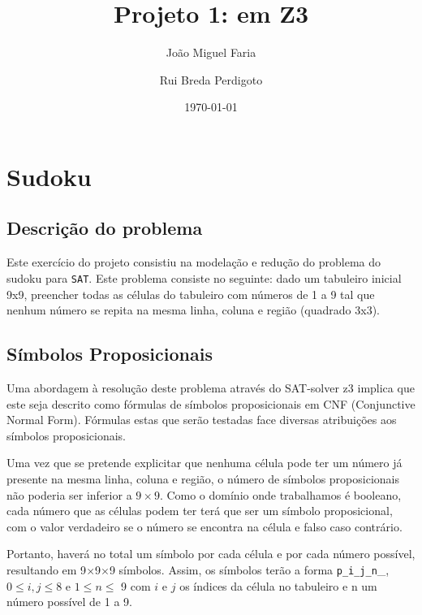 \documentclass[a4paper,12pt]{article}
\title{Projeto 1: \sat em {Z3}}
\author{João Miguel Faria \and Rui Breda Perdigoto}
\date{\today}
\theoremstyle{definition}
\theoremstyle{theorem}
\theoremstyle{remark}
\newcommand{\sat}{\texttt{SAT}\xspace}
\begin{document}
\maketitle

\section{Sudoku}

\subsection{Descrição do problema}
Este exercício do projeto consistiu na modelação e redução do problema do
sudoku para \sat. Este problema consiste no seguinte: dado um tabuleiro inicial
9x9, preencher todas as células do tabuleiro com números de 1 a 9 tal que
nenhum número se repita na mesma linha, coluna e região (quadrado 3x3).

\subsection{Símbolos Proposicionais}
Uma abordagem à resolução deste problema através do SAT-solver z3 implica que
este seja descrito como fórmulas de símbolos proposicionais em CNF (Conjunctive
Normal Form). Fórmulas estas que serão testadas face diversas atribuições aos
símbolos proposicionais.

Uma vez que se pretende explicitar que nenhuma célula pode ter um número já
presente na mesma linha, coluna e região, o número de símbolos proposicionais
não poderia ser inferior a $9\times9$. Como o domínio onde trabalhamos é
booleano, cada número que as células podem ter terá que ser um símbolo
proposicional, com o valor verdadeiro se o número se encontra na célula e falso
caso contrário.
 
Portanto, haverá no total um símbolo por cada célula e por cada número
possível, resultando em 9$\times$9$\times$9 símbolos. Assim, os símbolos terão
a forma \texttt{p\_i\_j\_n}\_, $0\leq i, j \leq 8$
e $1 \leq n \leq$ 9 com $i$ e $j$ os índices da célula no tabuleiro e n um
número possível de 1 a 9.
\end{document}
